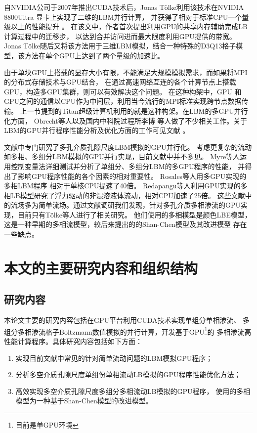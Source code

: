 自NVIDIA公司于2007年推出CUDA技术后，Jonas T\"olke利用该技术在NVIDIA 8800Ultra 显卡上实现了二维的LBM并行计算，
并获得了相对于标准CPU一个量级以上的性能提升  。
在该文中，作者首次提出利用GPU的共享内存辅助完成LB计算过程中的迁移步， 以达到合并访问进而最大限度利用GPU提供的带宽。
Jonas T\"olke随后又将该方法用于三维LBM模拟，结合一种特殊的D3Q13格子模型，该方法在单个GPU上达到了两个量级的加速比。

由于单块GPU上搭载的显存大小有限，不能满足大规模模拟需求，而如果将MPI的分布式存储技术与GPU结合，
在通过高速网络互连的各个计算节点上搭载GPU，构造多GPU集群，则可以有效解决这个问题。
在这种构架中，GPU 和 GPU之间的通信以CPU作为中间层，利用当今流行的MPI标准实现跨节点数据传输。
上一节提到的Titan超级计算机利用的就是这种构架。在LBM的多GPU并行化方面，
Obrecht等人以及国内中科院过程所李博 
等人做了不少相关工作。关于LBM的GPU并行程序性能分析及优化方面的工作可见文献
\cite{habich2008performance, huang2011, ren2010optimization, myre2011performance}。

文献\cite{aksnesporous, aksnesporous, tolke2010computer}中专门研究了多孔介质孔隙尺度LBM模拟的GPU并行化。
考虑更复杂的流动如多相、多组分LBM模拟的GPU并行实现，目前文献中并不多见。
Myre等人运用控制变量法详细测试并分析了单组分、多组分LBM的多GPU程序的性能，
并得出了影响GPU程序性能的各个因素的相对重要性。 Rosales等人用多GPU实现的多相LBM程序
相对于单核CPU提速了40倍。
Redapangu等人利用GPU实现的多相LB模型研究了浮力驱动的非混溶液体流动，相对CPU加速了25倍。
这些文献中的流场多为简单流场。通过文献调研我们发现，针对多孔介质多相渗流的GPU实现，目前只有T\"olke等人进行了相关研究。
他们使用的多相模型是颜色LBE模型，这是一种早期的多相流模型，较后来提出的的Shan-Chen模型及其改进模型
存在一些缺点。

\section{本文的主要研究内容和组织结构}
\subsection{研究内容}
本论文主要的研究内容包括在GPU平台利用CUDA技术实现单组分单相渗流、
多组分多相渗流格子Boltzmann数值模拟的并行计算，开发基于GPU\footnote{目前是单GPU环境}的
多相渗流高性能计算程序。具体研究内容包括如下方面：
\begin{enumerate}
  \item 实现目前文献中常见的针对简单流动问题的LBM模拟GPU程序；
  \item 分析多空介质孔隙尺度单组份单相流动LB模拟的GPU程序性能优化方法；
  \item 高效实现多空介质孔隙尺度多组分多相流动LB模拟的GPU程序，
    使用的多相模型为一种基于Shan-Chen模型的改进模型。
\end{enumerate} 

